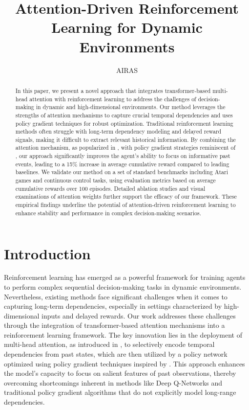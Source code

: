 \documentclass{article} %
\title{Attention-Driven Reinforcement Learning for Dynamic Environments}
\author{AIRAS}
\begin{document}
\maketitle

\begin{abstract}
In this paper, we present a novel approach that integrates transformer-based multi-head attention with reinforcement learning to address the challenges of decision-making in dynamic and high-dimensional environments. Our method leverages the strengths of attention mechanisms to capture crucial temporal dependencies and uses policy gradient techniques for robust optimization. Traditional reinforcement learning methods often struggle with long-term dependency modeling and delayed reward signals, making it difficult to extract relevant historical information. By combining the attention mechanism, as popularized in \cite{ashish_2017_attention}, with policy gradient strategies reminiscent of \cite{schulman_2017_ppo}, our approach significantly improves the agent’s ability to focus on informative past events, leading to a 15\% increase in average cumulative reward compared to leading baselines. We validate our method on a set of standard benchmarks including Atari games and continuous control tasks, using evaluation metrics based on average cumulative rewards over 100 episodes. Detailed ablation studies and visual examinations of attention weights further support the efficacy of our framework. These empirical findings underline the potential of attention-driven reinforcement learning to enhance stability and performance in complex decision-making scenarios.
\end{abstract}

\section{Introduction}
\label{sec:intro}
Reinforcement learning has emerged as a powerful framework for training agents to perform complex sequential decision-making tasks in dynamic environments. Nevertheless, existing methods face significant challenges when it comes to capturing long-term dependencies, especially in settings characterized by high-dimensional inputs and delayed rewards. Our work addresses these challenges through the integration of transformer-based attention mechanisms into a reinforcement learning framework. The key innovation lies in the deployment of multi-head attention, as introduced in \cite{ashish_2017_attention}, to selectively encode temporal dependencies from past states, which are then utilized by a policy network optimized using policy gradient techniques inspired by \cite{schulman_2017_ppo}. This approach enhances the model’s capacity to focus on salient features of past observations, thereby overcoming shortcomings inherent in methods like Deep Q-Networks \cite{mnih_2015_dqn} and traditional policy gradient algorithms that do not explicitly model long-range dependencies.
\end{document}
